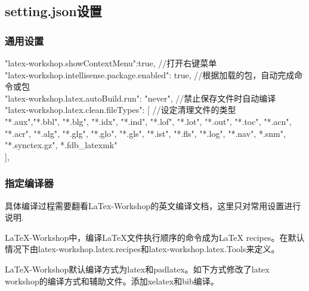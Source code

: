 \documentclass[10pt, UTF8]{ctexart}%
\def\CodingInline#1{\colorbox{shadecolor}{\color{black}#1}}%
\begin{document}
    \subsection{setting.json设置}
        \subsubsection{通用设置}
            \begin{shaded}
                \noindent "latex-workshop.showContextMenu":true,         //打开右键菜单
                \\"latex-workshop.intellisense.package.enabled": true,  //根据加载的包，自动完成命令或包  
                \\"latex-workshop.latex.autoBuild.run": "never",        //禁止保存文件时自动编译
                \\"latex-workshop.latex.clean.fileTypes": [  //设定清理文件的类型 
                \\"*.aux","*.bbl", "*.blg", "*.idx", "*.ind", "*.lof", "*.lot", "*.out", "*.toc", "*.acn", "*.acr", "*.alg", "*.glg", "*.glo", "*.gls", "*.ist", "*.fls", "*.log", "*.nav", *.snm", "*.synctex.gz", *.fdb_latexmk" 
                \\],  
            \end{shaded}

        \subsubsection{指定编译器}
        具体编译过程需要翻看LaTex-Workshop的英文编译文档\cite{Latex-Workshop-Compile}，这里只对常用设置进行说明.        
        
        LaTeX-Workshop中，编译LaTeX文件执行顺序的命令成为LaTeX recipes。在默认情况下由\CodingInline{latex-workshop.latex.recipes}和\CodingInline{latex-workshop.latex.Tools}来定义。

        LaTeX-Workshop默认编译方式为\CodingInline{latex}和\CodingInline{padlatex}。如下方式修改了latex workshop的编译方式和辅助文件。添加xelatex和bib编译。
\end{document}
